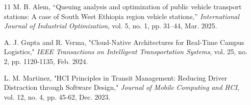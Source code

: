 \documentclass[conference]{IEEEtran}
\begin{document}
\begin{thebibliography}{11}
M. B. Alem, “Queuing analysis and optimization of public vehicle transport stations: A case of South West Ethiopia region vehicle stations,” \textit{International Journal of Industrial Optimization}, vol. 5, no. 1, pp. 31–44, Mar. 2025.

A. J. Gupta and R. Verma, "Cloud-Native Architectures for Real-Time Campus Logistics," \textit{IEEE Transactions on Intelligent Transportation Systems}, vol. 25, no. 2, pp. 1120-1135, Feb. 2024.

L. M. Martinez, "HCI Principles in Transit Management: Reducing Driver Distraction through Software Design," \textit{Journal of Mobile Computing and HCI}, vol. 12, no. 4, pp. 45-62, Dec. 2023.

\end{thebibliography}
\end{document}
